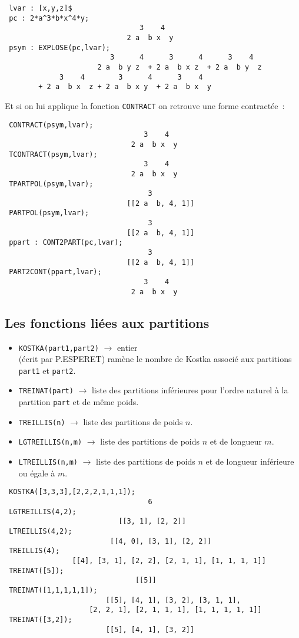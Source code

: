 \documentclass[11pt]{article}
\begin{document}
\small
\begin{verbatim}
 lvar : [x,y,z]$
 pc : 2*a^3*b*x^4*y;  
                                3    4
                             2 a  b x  y
 psym : EXPLOSE(pc,lvar);
                         3      4      3      4      3    4   
                      2 a  b y z  + 2 a  b x z  + 2 a  b y  z 
             3    4        3      4      3    4
        + 2 a  b x  z + 2 a  b x y  + 2 a  b x  y
\end{verbatim}
\normalsize
Et si on lui applique la fonction {\tt CONTRACT} on retrouve une forme 
contract\'ee~:
\small
\begin{verbatim}
 CONTRACT(psym,lvar);
                                 3    4
                              2 a  b x  y
 TCONTRACT(psym,lvar);
                                 3    4
                              2 a  b x  y
 TPARTPOL(psym,lvar);
                                  3
                             [[2 a  b, 4, 1]]
 PARTPOL(psym,lvar);
                                  3
                             [[2 a  b, 4, 1]]
 ppart : CONT2PART(pc,lvar);
                                  3
                             [[2 a  b, 4, 1]]
 PART2CONT(ppart,lvar);
                                 3    4
                              2 a  b x  y
\end{verbatim}
\normalsize

\subsection{Les fonctions li\'ees aux partitions}
\begin{itemize}
\item {\tt KOSTKA(part1,part2)} 
$\longrightarrow$ entier\\
 (\'ecrit par P.ESPERET) ram\`ene le
nombre de Kostka associ\'e aux partitions {\tt part1} et {\tt part2}.
\item {\tt TREINAT(part)}  
$\longrightarrow$ liste des partitions 
inf\'erieures pour l'ordre naturel
\`a la partition {\tt part} et de m\^eme poids.
\item{\tt TREILLIS(n)}  
$\longrightarrow$ liste des partitions de poids $n$.
\item {\tt LGTREILLIS(n,m)}  
$\longrightarrow$ 
liste des partitions de poids $n$ et
de longueur  $m$.
\item {\tt LTREILLIS(n,m)}  
$\longrightarrow$ 
liste des partitions de poids $n$ et
de longueur inf\'erieure ou \'egale \`a  $m$.
\end{itemize}
\small
\begin{verbatim}
 KOSTKA([3,3,3],[2,2,2,1,1,1]);
                                  6
 LGTREILLIS(4,2);
                           [[3, 1], [2, 2]]
 LTREILLIS(4,2);
                         [[4, 0], [3, 1], [2, 2]]
 TREILLIS(4);
                [[4], [3, 1], [2, 2], [2, 1, 1], [1, 1, 1, 1]]
 TREINAT([5]);
                               [[5]]
 TREINAT([1,1,1,1,1]);
                        [[5], [4, 1], [3, 2], [3, 1, 1],
                    [2, 2, 1], [2, 1, 1, 1], [1, 1, 1, 1, 1]]
 TREINAT([3,2]);
                        [[5], [4, 1], [3, 2]]
\end{verbatim}
\normalsize
\end{document}
